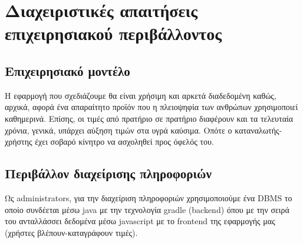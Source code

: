 \section{Διαχειριστικές απαιτήσεις επιχειρησιακού περιβάλλοντος}

\subsection{Επιχειρησιακό μοντέλο}
Η εφαρμογή που σχεδιάζουμε θα είναι χρήσιμη και αρκετά διαδεδομένη καθώς, αρχικά, αφορά ένα απαραίτητο προϊόν που η πλειοψηφία των ανθρώπων χρησιμοποιεί καθημερινά. Επίσης, οι τιμές από πρατήριο σε πρατήριο διαφέρουν και τα τελευταία χρόνια, γενικά, υπάρχει αύξηση τιμών στα υγρά καύσιμα. Οπότε ο καταναλωτής-χρήστης έχει σοβαρό κίνητρο να ασχοληθεί προς όφελός του.



\subsection{Περιβάλλον διαχείρισης πληροφοριών}
Ως administrators, για την διαχείριση πληροφοριών χρησιμοποιούμε ένα DBMS το οποίο συνδέεται μέσω java με την τεχνολογία gradle (backend) όπου με την σειρά του ανταλλάσσει δεδομένα μέσω javascript με το frontend της εφαρμογής μας (χρήστες βλέπουν-καταγράφουν τιμές).



